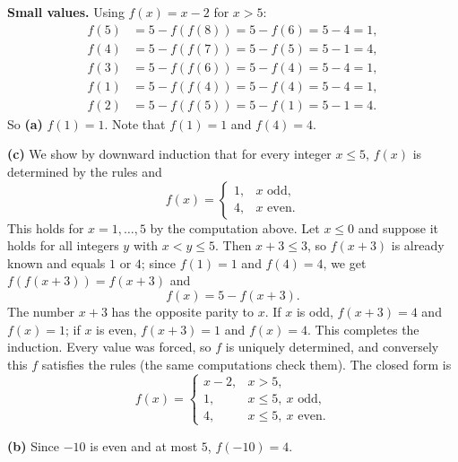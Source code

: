 \textbf{Small values.} Using $f(x)=x-2$ for $x>5$:
\[
\begin{aligned}
f(5)&=5-f(f(8))=5-f(6)=5-4=1,\\
f(4)&=5-f(f(7))=5-f(5)=5-1=4,\\
f(3)&=5-f(f(6))=5-f(4)=5-4=1,\\
f(1)&=5-f(f(4))=5-f(4)=5-4=1,\\
f(2)&=5-f(f(5))=5-f(1)=5-1=4.
\end{aligned}
\]
So \textbf{(a)} $f(1)=\boxed{1}$. Note that $f(1)=1$ and $f(4)=4$.

\textbf{(c)} We show by downward induction that for every integer $x\le5$, $f(x)$ is determined by the rules and
\[
f(x)=\begin{cases}1,&x\text{ odd},\\4,&x\text{ even}.\end{cases}
\]
This holds for $x=1,\dots,5$ by the computation above. Let $x\le0$ and suppose it holds for all integers $y$ with $x<y\le5$. Then $x+3\le3$, so $f(x+3)$ is already known and equals $1$ or $4$; since $f(1)=1$ and $f(4)=4$, we get $f(f(x+3))=f(x+3)$ and
\[
f(x)=5-f(x+3).
\]
The number $x+3$ has the opposite parity to $x$. If $x$ is odd, $f(x+3)=4$ and $f(x)=1$; if $x$ is even, $f(x+3)=1$ and $f(x)=4$. This completes the induction. Every value was forced, so $f$ is uniquely determined, and conversely this $f$ satisfies the rules (the same computations check them). The closed form is
\[
f(x)=\begin{cases}x-2,&x>5,\\1,&x\le5,\ x\text{ odd},\\4,&x\le5,\ x\text{ even}.\end{cases}
\]

\textbf{(b)} Since $-10$ is even and at most $5$, $f(-10)=\boxed{4}$.
